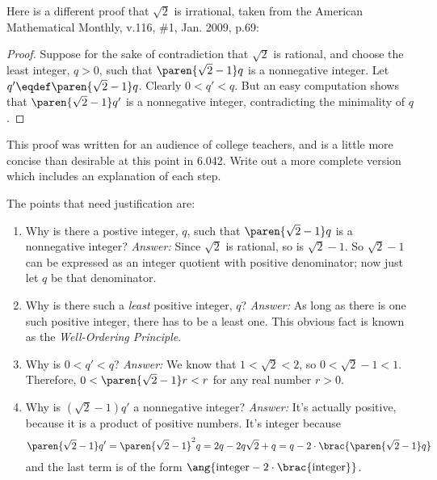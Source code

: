 \documentclass[handout]{mcs}
\begin{document}
\begin{problem}
Here is a different proof that $\sqrt{2}$ is irrational, taken from the
American Mathematical Monthly, v.116, \#1, Jan. 2009, p.69:

\begin{proof}
  Suppose for the sake of contradiction that $\sqrt{2}$ is rational, and
  choose the least integer, $q>0$, such that $\paren{\sqrt{2}-1}q$ is a
  nonnegative integer.  Let $q' \eqdef \paren{\sqrt{2}-1}q$.  Clearly $0<
  q' < q$.  But an easy computation shows that $\paren{\sqrt{2}-1}q'$ is a
  nonnegative integer, contradicting the minimality of $q$.
\end{proof}

\bparts

\ppart This proof was written for an audience of college teachers, and is
a little more concise than desirable at this point in 6.042.  Write out a
more complete version which includes an explanation of each step.

\begin{solution}
The points that need justification are:

\begin{enumerate}
\item Why is there a postive integer, $q$, such that $\paren{\sqrt{2}-1}q$
  is a nonnegative integer?  \emph{Answer:} Since $\sqrt{2}$ is rational,
  so is $\sqrt{2}-1$.  So $\sqrt{2}-1$ can be expressed as an integer
  quotient with positive denominator; now just let $q$ be that
  denominator.

\item Why is there such a \emph{least} positive integer, $q$?
  \emph{Answer:} As long as there is one such positive integer, there has
  to be a least one.  This obvious fact is known as the
  \emph{Well-Ordering Principle}.

\item Why is $0< q' < q$?  \emph{Answer:} We know that $1 < \sqrt{2} < 2$,
  so $0 < \sqrt{2}-1 < 1$.  Therefore, $0 < \paren{\sqrt{2}-1}r < r$ for any
  real number $r>0$.

\item Why is $(\sqrt{2}-1)q'$ a nonnegative integer?  \emph{Answer:} It's
  actually positive, because it is a product of positive numbers.  It's
  integer because
  \[
  \paren{\sqrt{2}-1}q' = \paren{\sqrt{2}-1}^2q = 2q - 2q\sqrt{2} + q =
  q-2\cdot\brac{\paren{\sqrt{2}-1}q}
  \]
  and the last term is of the form
  $\ang{\text{integer}-2 \cdot \brac{\text{integer}}}$.


\end{enumerate}
\end{solution}
\end{problem}
\end{document}
